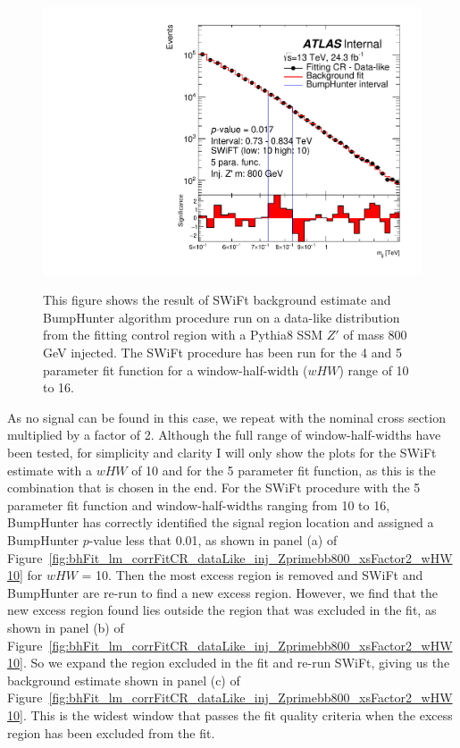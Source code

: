 \begin{figure}[!htb]
 {
  \includegraphics[width=0.45\linewidth, angle=0]{figs/Dibjet/LowMass/FitStudy/bhFit_corrFitCR_dataLike_5para_low10_high10_inj_Zprimebb800_xsFactor1.pdf}
}
\vspace{10pt}
\caption{\label{fig:bhFit_lm_corrFitCR_dataLike_inj_Zprimebb800_xsFactor1}
  This figure shows the result of SWiFt background estimate and {\sc BumpHunter} algorithm procedure run on a data-like distribution
  from the fitting control region with a Pythia8 SSM $Z'$ of mass 800 GeV injected.
  The SWiFt procedure has been run for the 4 and 5 parameter fit function for a window-half-width ($wHW$) range of 10 to 16.
}
\end{figure}

As no signal can be found in this case, we repeat with the nominal cross section multiplied by a factor of 2.
Although the full range of window-half-widths have been tested,
for simplicity and clarity I will only show the plots for the SWiFt estimate with a $wHW$ of 10 and for the 5 parameter fit function,
as this is the combination that is chosen in the end.
For the SWiFt procedure with the 5 parameter fit function and window-half-widths ranging from 10 to 16,
{\sc BumpHunter} has correctly identified the signal region location and assigned a {\sc BumpHunter} $p$-value less that 0.01,
as shown in panel (a) of Figure~\ref{fig:bhFit_lm_corrFitCR_dataLike_inj_Zprimebb800_xsFactor2_wHW10} for $wHW$ = 10.
Then the most excess region is removed and SWiFt and {\sc BumpHunter} are re-run to find a new excess region.
However, we find that the new excess region found lies outside the region that was excluded in the fit,
as shown in panel (b) of Figure~\ref{fig:bhFit_lm_corrFitCR_dataLike_inj_Zprimebb800_xsFactor2_wHW10}.
So we expand the region excluded in the fit and re-run SWiFt,
giving us the background estimate shown in panel (c) of Figure~\ref{fig:bhFit_lm_corrFitCR_dataLike_inj_Zprimebb800_xsFactor2_wHW10}.
This is the widest window that passes the fit quality criteria when the excess region has been excluded from the fit.

